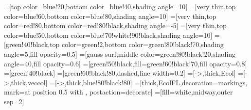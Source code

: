 \tikzset{>=latex} %

=[top color=blue!20,bottom color=blue!40,shading angle=10]
=[very thin,top color=blue!60,bottom color=blue!80,shading angle=10]
=[very thin,top color=red!80,bottom color=red!80!black,shading angle=-5]
=[very thin,top color=blue!50,bottom color=blue!70!white!90!black,shading angle=10]
=[green!40!black,top color=green!2,bottom color=green!80!black!70,shading angle=5,fill opacity=0.5]
=[gauss surf,middle color=green!80!black!20,shading angle=40,fill opacity=0.6]
=[green!50!black,fill=green!60!black!70,fill opacity=0.8]
=[green!40!black]
=[green!60!black!80,dashed,line width=0.2]
=[->,thick,Ecol]
=[->,thick,veccol]
=[->,thick,blue!80!black!80]
=[thick,EcolFL,decoration={markings,
          mark=at position 0.5 with {}},
          postaction={decorate}]
=[fill=white,midway,outer sep=2]
\def\L{8}
\def\W{0.25}
\def\N{14}





